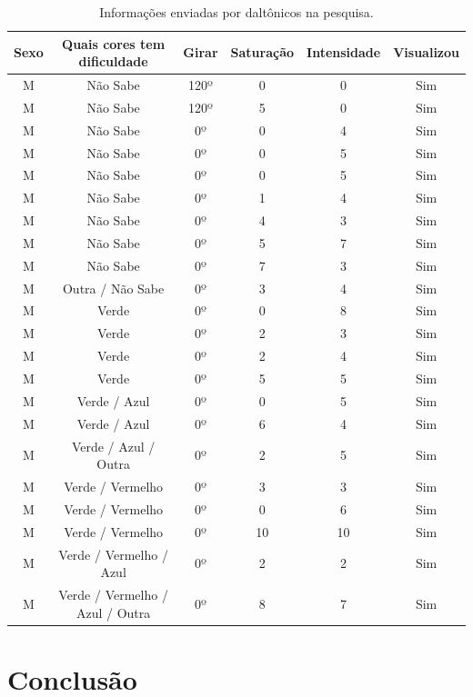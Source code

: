 \documentclass[	12pt, Times, openright, twoside, a4paper, english, brazil]{abntex2}
\begin{document}
\begin{table}[ht]
\centering
\begin{tabular}{cccccc}
\hline      
\textbf{Sexo} & \textbf{Quais cores tem dificuldade} & \textbf{Girar} & \textbf{Saturação} & \textbf{Intensidade} & \textbf{Visualizou}    \\ \hline

M	&	Não Sabe	&	120º	&	0	&	0	&	Sim	\\ \hline
M	&	Não Sabe	&	120º	&	5	&	0	&	Sim	\\ \hline
M	&	Não Sabe	&	0º	&	0	&	4	&	Sim	\\ \hline
M	&	Não Sabe	&	0º	&	0	&	5	&	Sim	\\ \hline
M	&	Não Sabe	&	0º	&	0	&	5	&	Sim	\\ \hline
M	&	Não Sabe	&	0º	&	1	&	4	&	Sim	\\ \hline
M	&	Não Sabe	&	0º	&	4	&	3	&	Sim	\\ \hline
M	&	Não Sabe	&	0º	&	5	&	7	&	Sim	\\ \hline
M	&	Não Sabe	&	0º	&	7	&	3	&	Sim	\\ \hline
M	&	Outra / Não Sabe	&	0º	&	3	&	4	&	Sim	\\ \hline
M	&	Verde 	&	0º	&	0	&	8	&	Sim	\\ \hline
M	&	Verde 	&	0º	&	2	&	3	&	Sim	\\ \hline
M	&	Verde 	&	0º	&	2	&	4	&	Sim	\\ \hline
M	&	Verde 	&	0º	&	5	&	5	&	Sim	\\ \hline
M	&	Verde / Azul 	&	0º	&	0	&	5	&	Sim	\\ \hline
M	&	Verde / Azul 	&	0º	&	6	&	4	&	Sim	\\ \hline
M	&	Verde / Azul / Outra 	&	0º	&	2	&	5	&	Sim	\\ \hline
M	&	Verde / Vermelho	&	0º	&	3	&	3	&	Sim	\\ \hline
M	&	Verde / Vermelho 	&	0º	&	0	&	6	&	Sim	\\ \hline
M	&	Verde / Vermelho 	&	0º	&	10	&	10	&	Sim	\\ \hline
M	&	Verde / Vermelho / Azul 	&	0º	&	2	&	2	&	Sim	\\ \hline
M	&	Verde / Vermelho / Azul / Outra 	&	0º	&	8	&	7	&	Sim	\\ \hline


\end{tabular}
\caption{Informações enviadas por daltônicos na pesquisa.}
\label{tab:respostasPesquisa}
\end{table}

\chapter{Conclusão}
\label{cap:conclusao}
\end{document}
